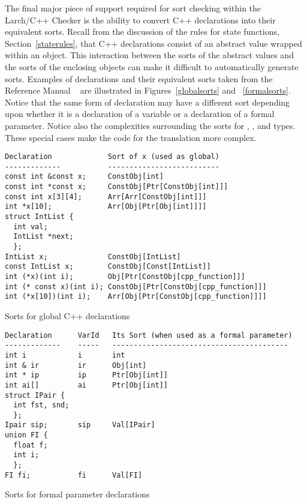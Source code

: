 The final major piece of support required for sort checking within the
Larch/C++ Checker is the ability to convert C++ declarations into
their equivalent sorts. Recall from the discussion of the rules for
state functions, Section~\ref{staterules}, that C++ declarations
consist of an abstract value wrapped within an object. This
interaction between the sorts of the abstract values and the sorts of
the enclosing objects can make it difficult to automatically generate
sorts. Examples of declarations and their equivalent sorts taken from
the Reference Manual ~\cite[Chapter 5 and Section 6.1.8.1]{Leavens96c}
are illustrated in Figures~\ref{globalsorts} and
~\ref{formalsorts}. Notice that the same form of declaration may have
a different sort depending upon whether it is a declaration of a
variable or a declaration of a formal parameter. Notice also the
complexities surrounding the sorts for
, , and  types. These
special cases make the code for the translation more complex.


\begin{BFIGURE}
\begin{verbatim}
Declaration             Sort of x (used as global)
-------------           --------------------------
const int &const x;     ConstObj[int]
const int *const x;     ConstObj[Ptr[ConstObj[int]]]
const int x[3][4];      Arr[Arr[ConstObj[int]]]
int *x[10];             Arr[Obj[Ptr[Obj[int]]]]
struct IntList {
  int val;
  IntList *next;
  };
IntList x;              ConstObj[IntList]
const IntList x;        ConstObj[Const[IntList]]
int (*x)(int i);        Obj[Ptr[ConstObj[cpp_function]]]
int (* const x)(int i); ConstObj[Ptr[ConstObj[cpp_function]]]
int (*x[10])(int i);    Arr[Obj[Ptr[ConstObj[cpp_function]]]]
\end{verbatim}
\caption{Sorts for global C++ declarations}
\label{globalsorts}
\end{BFIGURE}

\begin{BFIGURE}
\begin{verbatim}
Declaration      VarId   Its Sort (when used as a formal parameter)
-------------    -----   -----------------------------------------
int i            i       int
int & ir         ir      Obj[int]
int * ip         ip      Ptr[Obj[int]]
int ai[]         ai      Ptr[Obj[int]]
struct IPair {
  int fst, snd;
  };
Ipair sip;       sip     Val[IPair]
union FI {
  float f;
  int i;
  };
FI fi;           fi      Val[FI]
\end{verbatim}
\caption{Sorts for formal parameter declarations}
\label{formalsorts}
\end{BFIGURE}

